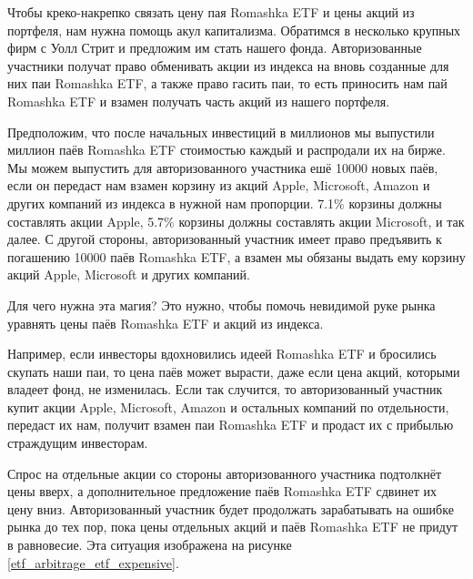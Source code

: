 Чтобы креко-накрепко связать цену пая Romashka ETF и цены акций из портфеля, нам 
нужна помощь акул капитализма. Обратимся в несколько крупных фирм с Уолл Стрит и 
предложим им стать  
нашего фонда. Авторизованные участники получат право обменивать акции из индекса 
на вновь созданные для них паи Romashka ETF, а также право гасить паи, то есть 
приносить нам пай Romashka ETF и взамен получать часть акций из нашего портфеля.

Предположим, что после начальных инвестиций в  миллионов мы 
выпустили миллион паёв Romashka ETF стоимостью  каждый и распродали 
их на бирже. Мы можем выпустить для авторизованного участника ешё \num{10000} 
новых паёв, если он передаст нам взамен корзину из акций Apple, Microsoft, 
Amazon и других компаний из индекса в нужной нам пропорции. 7.1\% корзины должны 
составлять акции Apple, 5.7\% корзины должны составлять акции Microsoft, и так 
далее. С другой стороны, авторизованный участник имеет право предъявить к 
погашению \num{10000} паёв Romashka ETF, а взамен мы обязаны выдать ему корзину 
акций Apple, Microsoft и других компаний.

Для чего нужна эта магия? Это нужно, чтобы помочь невидимой руке рынка уравнять 
цены паёв Romashka ETF и акций из индекса.

Например, если инвесторы вдохновились идеей Romashka ETF и бросились скупать 
наши паи, то цена паёв может вырасти, даже если цена акций, которыми владеет 
фонд, не изменилась. Если так случится, то авторизованный участник купит акции 
Apple, Microsoft, Amazon и остальных компаний по отдельности, передаст их нам, 
получит взамен паи Romashka ETF и продаст их с прибылью страждущим инвесторам.

Спрос на отдельные акции со стороны авторизованного участника подтолкнёт цены 
вверх, а дополнительное предложение паёв Romashka ETF сдвинет их цену вниз. 
Авторизованный участник будет продолжать зарабатывать на ошибке рынка до тех 
пор, пока цены отдельных акций и паёв Romashka ETF не придут в равновесие. Эта 
ситуация изображена на рисунке \ref{etf_arbitrage_etf_expensive}.

